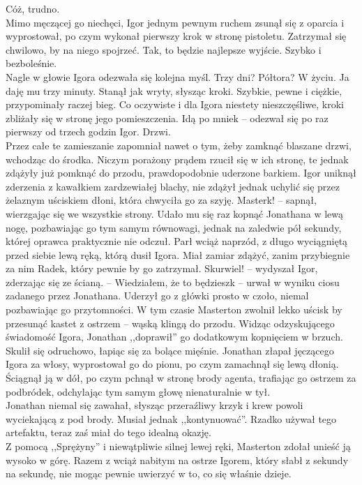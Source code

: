 \documentclass[../MAIN.tex]{subfiles}
\begin{document}
Cóż, trudno.\\
Mimo męczącej go niechęci, Igor jednym pewnym ruchem zsunął się z oparcia i wyprostował, po czym wykonał pierwszy krok w stronę pistoletu. Zatrzymał się chwilowo, by na niego spojrzeć. Tak, to będzie najlepsze wyjście. Szybko i bezboleśnie.\\
Nagle w głowie Igora odezwała się kolejna myśl.
\sx Trzy dni? Półtora? W życiu. Ja daję mu trzy minuty.
\qd
Stanął jak wryty, słysząc kroki. Szybkie, pewne i ciężkie, przypominały raczej bieg. Co oczywiste i dla Igora niestety nieszczęśliwe, kroki zbliżały się w stronę jego pomieszczenia.
\sx Idą po mnie\3k -- odezwał się po raz pierwszy od trzech godzin Igor.
\qd
Drzwi.\\
Przez całe te zamieszanie zapomniał nawet o tym, żeby zamknąć blaszane drzwi, wchodząc do środka. Niczym porażony prądem rzucił się w ich stronę, te jednak zdążyły już pomknąć do przodu, prawdopodobnie uderzone barkiem. Igor uniknął zderzenia z kawałkiem zardzewiałej blachy, nie zdążył jednak uchylić się przez żelaznym uściskiem dłoni, która chwyciła go za szyję.
\sx Master\3k! -- sapnął, wierzgając się we wszystkie strony.
\qd
Udało mu się raz kopnąć Jonathana w lewą nogę, pozbawiając go tym samym równowagi, jednak na zaledwie pół sekundy, której oprawca praktycznie nie odczuł. Parł wciąż naprzód, z długo wyciągniętą przed siebie lewą ręką, którą dusił Igora. Miał zamiar zdążyć, zanim przybiegnie za nim Radek, który pewnie by go zatrzymał.
\sx Skurwiel! -- wydyszał Igor, zderzając się ze ścianą. -- Wiedziałem, że to będziesz\3k -- urwał w wyniku ciosu zadanego przez Jonathana.
\qd
Uderzył go z główki prosto w czoło, niemal pozbawiając go przytomności. W tym czasie Masterton zwolnił lekko uścisk by przesunąć kastet z ostrzem -- wąską klingą do przodu. Widząc odzyskującego świadomość Igora, Jonathan ,,doprawił'' go dodatkowym kopnięciem w brzuch. Skulił się odruchowo, łapiąc się za bolące mięśnie. Jonathan złapał jęczącego Igora za włosy, wyprostował go do pionu, po czym zamachnął się lewą dłonią. Ściągnął ją w dół, po czym pchnął w stronę brody agenta, trafiając go ostrzem za podbródek, odchylając tym samym głowę nienaturalnie w tył.\\
Jonathan niemal się zawahał, słysząc przeraźliwy krzyk i krew powoli wyciekającą z pod brody. Musiał jednak ,,kontynuować''. Rzadko używał tego artefaktu, teraz zaś miał do tego idealną okazję.\\
Z pomocą ,,Sprężyny'' i niewątpliwie silnej lewej ręki, Masterton zdołał unieść ją wysoko w górę. Razem z wciąż nabitym na ostrze Igorem, który słabł z sekundy na sekundę, nie mogąc pewnie uwierzyć w to, co się właśnie dzieje.\\
\end{document}
